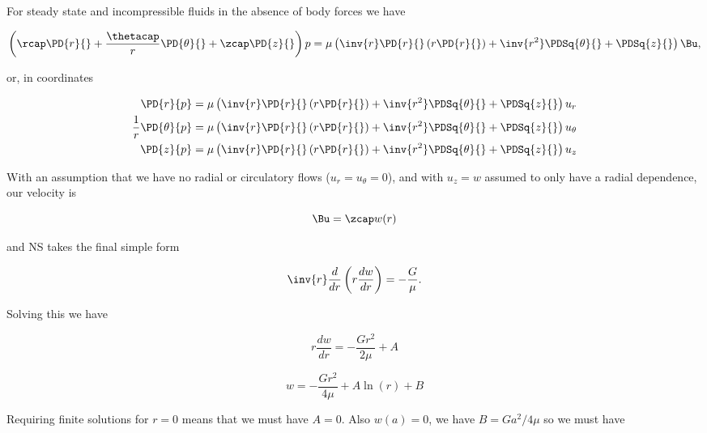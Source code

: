 For steady state and incompressible fluids in the absence of body forces we have

\begin{equation}\label{eqn:continuumL12:670}
\left(
\rcap \PD{r}{} + 
\frac{\thetacap}{r} \PD{\theta}{} + 
\zcap \PD{z}{}
\right)
p = \mu \left(
\inv{r} \PD{r}{} \left( r \PD{r}{} \right) + \inv{r^2} \PDSq{\theta}{} + \PDSq{z}{} \right)
\Bu,
\end{equation}

or, in coordinates

\begin{align}\label{eqn:continuumL12:690}
\PD{r}{p}  
&= \mu \left(
\inv{r} \PD{r}{} \left( r \PD{r}{} \right) + \inv{r^2} \PDSq{\theta}{} + \PDSq{z}{} \right)
u_r \\
\frac{1}{r} \PD{\theta}{p}
&= \mu \left(
\inv{r} \PD{r}{} \left( r \PD{r}{} \right) + \inv{r^2} \PDSq{\theta}{} + \PDSq{z}{} \right)
u_\theta \\
\PD{z}{p}
&= \mu \left(
\inv{r} \PD{r}{} \left( r \PD{r}{} \right) + \inv{r^2} \PDSq{\theta}{} + \PDSq{z}{} \right)
u_z
\end{align}

With an assumption that we have no radial or circulatory flows ($u_r = u_\theta = 0$), and with $u_z = w$ assumed to only have a radial dependence, our velocity is

\begin{equation}\label{eqn:continuumL12:50}
\Bu = \zcap w(r)
\end{equation}

and NS takes the final simple form

\begin{equation}\label{eqn:continuumL12:70}
\inv{r} \frac{d}{dr} \left( r \frac{dw}{dr} \right) = - \frac{G}{\mu}.
\end{equation}

Solving this we have

\begin{equation}\label{eqn:continuumL12:90}
r \frac{dw}{dr} = - \frac{G r^2}{2\mu} + A
\end{equation}

\begin{equation}\label{eqn:continuumL12:110}
w = -\frac{G r^2}{4 \mu} + A \ln(r) + B
\end{equation}

Requiring finite solutions for $r = 0$ means that we must have $A = 0$.  Also $w(a) = 0$, we have $B = G a^2/4 \mu$ so we must have

